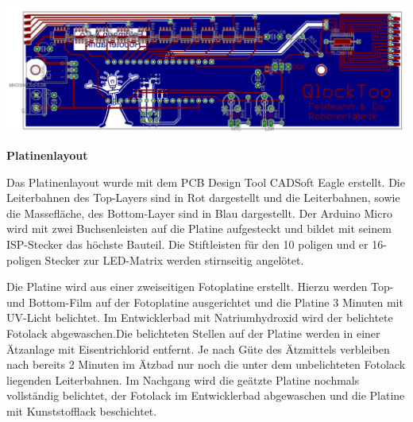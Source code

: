 {
\centering 
\includegraphics[width=\textwidth]{Abbildungen/Elektronik/Layout01} 
}
\begin{multicols}{2}

\textbf{Platinenlayout}

Das Platinenlayout wurde mit dem PCB Design Tool CADSoft Eagle erstellt. Die Leiterbahnen des Top-Layers sind in Rot dargestellt und die Leiterbahnen, sowie die Massefläche, des Bottom-Layer sind in Blau dargestellt. 
Der Arduino Micro wird mit zwei Buchsenleisten auf die Platine aufgesteckt und bildet mit seinem ISP-Stecker das höchste Bauteil. Die Stiftleisten für den 10 poligen und er 16-poligen Stecker zur LED-Matrix werden stirnseitig angelötet.

Die Platine wird aus einer zweiseitigen Fotoplatine erstellt. Hierzu werden Top- und Bottom-Film auf der Fotoplatine ausgerichtet und die Platine 3 Minuten mit UV-Licht belichtet. Im Entwicklerbad mit Natriumhydroxid wird der belichtete Fotolack abgewaschen.Die belichteten Stellen auf der Platine werden in einer Ätzanlage mit Eisentrichlorid entfernt. Je nach Güte des Ätzmittels verbleiben nach bereits 2 Minuten im Ätzbad nur noch die unter dem unbelichteten Fotolack liegenden Leiterbahnen. Im Nachgang wird die geätzte Platine nochmals vollständig belichtet, der Fotolack im Entwicklerbad abgewaschen und die Platine mit Kunststofflack beschichtet.


\end{multicols}

